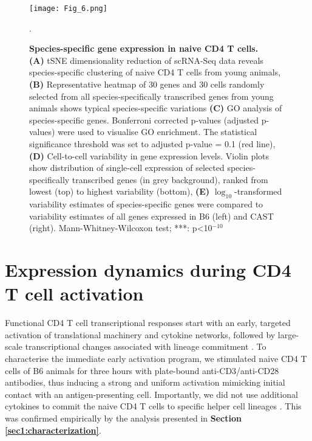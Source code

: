 \begin{figure}[!h]
\centering
\texttt{[image: Fig\_6.png]}
\caption[Species-specific gene expression in naive CD4\plus{} T cells]{\textbf{Species-specific gene expression in naive CD4\plus{} T cells.}\\
\textbf{(A)} tSNE dimensionality reduction of scRNA-Seq data reveals species-specific clustering of naive CD4\plus{} T cells from young animals, \textbf{(B)} Representative heatmap of 30 genes and 30 cells randomly selected from all species-specifically transcribed genes from young animals shows typical species-specific variations \textbf{(C)}  GO analysis of species-specific genes. Bonferroni corrected p-values (adjusted p-values) were used to visualise GO enrichment. The statistical significance threshold was set to adjusted p-value = 0.1 (red line), \textbf{(D)} Cell-to-cell variability in gene expression levels. Violin plots show distribution of single-cell expression of selected species-specifically transcribed genes (in grey background), ranked from lowest (top) to highest variability (bottom), \textbf{(E)} $\log_{10}$-transformed variability estimates of species-specific genes were compared to variability estimates of all genes expressed in B6 (left) and CAST (right). Mann-Whitney-Wilcoxon test; ***: p<10$^{-10}$}.
\label{fig1:species_specific}
\end{figure}

\newpage


\section{Expression dynamics during CD4\plus{} T cell activation}
\label{sec1:activation}

Functional CD4\plus{} T cell transcriptional responses start with an early, targeted activation of translational machinery and cytokine networks, followed by large-scale transcriptional changes associated with lineage commitment \citep{Shay2013, Asmal2003}. To characterise the immediate early activation program, we stimulated naive CD4\plus{} T cells of B6 animals for three hours with plate-bound anti-CD3\textepsilon{}/anti-CD28 antibodies, thus inducing a strong and uniform activation mimicking initial contact with an antigen-presenting cell. Importantly, we did not use additional cytokines to commit the naive CD4\plus{} T cells to specific helper cell lineages \citep{Zhu2010}. This was confirmed empirically by the analysis presented in \textbf{Section \ref{sec1:characterization}}. 

